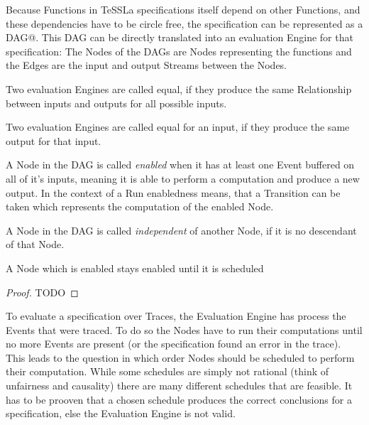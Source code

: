Because Functions in TeSSLa specifications itself depend on other Functions, and these dependencies have to be circle free,
the specification can be represented as a DAG@.
This DAG can be directly translated into an evaluation Engine for that specification: The Nodes of the DAGs are Nodes representing the functions and the Edges are the input and output Streams between the Nodes.

\begin{definition}[name=Equality of evaluation Engines]\label{def:equality_eval_engine}
  Two evaluation Engines are called equal, if they produce the same Relationship between inputs and outputs for all possible inputs.
\end{definition}

\begin{definition}[name=Equality of evaluation Engines]\label{def:equality_eval_engine_specific}
  Two evaluation Engines are called equal for an input, if they produce the same output for that input.
\end{definition}

\begin{definition}[name = Enabledness of Nodes]\label{def:node_enabled}
  A Node in the DAG is called \emph{enabled} when it has at least one Event buffered on all of it's inputs, meaning it is able to perform a computation and produce a new output.
  In the context of a Run enabledness means, that a Transition can be taken which represents the computation of the enabled Node.
\end{definition}

\begin{definition}[name = Equality of evaluation Engines]\label{def:node_independent}
  A Node in the DAG is called \emph{independent} of another Node, if it is no descendant of that Node.
\end{definition}

\begin{lemma}[name = Duration of Enabledness]\label{lemma:enabled_till_scheduled}
  A Node which is enabled stays enabled until it is scheduled
\end{lemma}

\begin{proof}
TODO
\end{proof}


To evaluate a specification over Traces, the Evaluation Engine has process the Events that were traced.
To do so the Nodes have to run their computations until no more Events are present (or the specification found an error in the trace).
This leads to the question in which order Nodes should be scheduled to perform their computation.
While some schedules are simply not rational (think of unfairness and causality) there are many different schedules that are feasible.
It has to be prooven that a chosen schedule produces the correct conclusions for a specification, else the Evaluation Engine is not valid.

